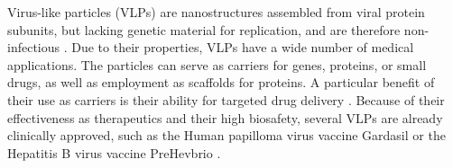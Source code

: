 

Virus-like particles (VLPs) are nanostructures assembled from viral protein subunits, but lacking genetic material for replication, and are therefore non-infectious \cite{vlps_def}. Due to their properties, VLPs have a wide number of medical applications. The particles can serve as carriers for genes, proteins, or small drugs, as well as employment as scaffolds for proteins. A particular benefit of their use as carriers is their ability for targeted drug delivery \cite{vlps_review}. Because of their effectiveness as therapeutics and their high biosafety, several VLPs are already clinically approved, such as the Human papilloma virus vaccine Gardasil\textsuperscript{\textregistered} or the Hepatitis B virus vaccine PreHevbrio\textsuperscript{\textregistered} \cite{vlps_clinically_approved}.

